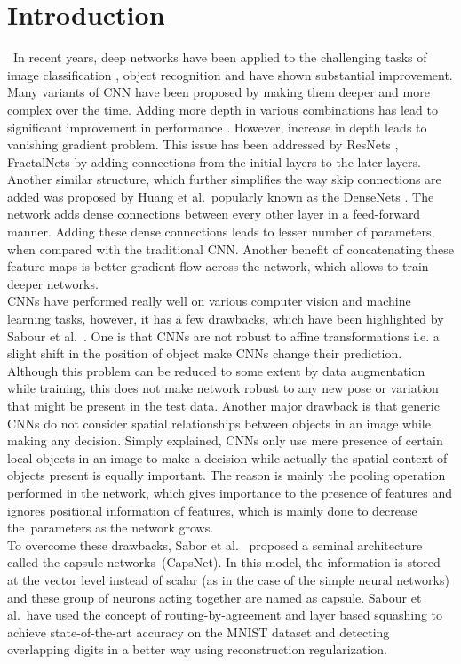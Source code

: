 \documentclass{bmvc2k}
\begin{document}
\section{Introduction}
\label{sec:intro} \
In recent years, deep networks have been applied to the challenging tasks of image classification \cite{Vgg, resnet, imagenet}, object recognition \cite{rec, decaf} and have shown substantial improvement. 
Many variants of CNN have been proposed by making them deeper and more complex over the time. Adding more depth in various combinations has lead to significant improvement in performance \cite{imagenet, Vgg, inception}. However, increase in depth leads to vanishing gradient problem. This issue has been addressed by ResNets \cite{resnet}, FractalNets \cite{fractalnet} by adding connections from the initial layers to the later layers. Another similar structure, which further simplifies the way skip connections are added was proposed by Huang et al.\ popularly known as the DenseNets \cite{densenet}. The network adds dense connections between every other layer in a feed-forward manner. Adding these dense connections leads to lesser number of parameters, when compared with the traditional CNN. Another benefit of concatenating these feature maps is better gradient flow across the network, which allows to train deeper networks.\\
CNNs have performed really well on various computer vision and machine learning tasks, however, it has a few drawbacks, which have been highlighted by Sabour et al.\ \cite{capsnet}. One is that CNNs are not robust to affine transformations i.e. a slight shift in the position of object make CNNs change their prediction. Although this problem can be reduced to some extent by data augmentation while training, this does not make network robust to any new pose or variation that might be present in the test data. Another major drawback is that generic CNNs do not consider spatial relationships between objects in an image while making any decision. Simply explained, CNNs only use mere presence of certain local objects in an image to make a decision while actually the spatial context of objects present is equally important. The reason is mainly the pooling operation performed in the network, which gives importance to the presence of features and ignores positional information of features, which is mainly done to decrease the\ parameters as the network grows. \\ 
To overcome these drawbacks, Sabor et al.\ \cite{capsnet} proposed a seminal architecture called the capsule networks~(CapsNet). In this model, the information is stored at the vector level instead of scalar (as in the case of the simple neural networks) and these group of neurons acting together are named as capsule. Sabour et al.\ have used the concept of routing-by-agreement and layer based squashing to achieve state-of-the-art accuracy on the MNIST dataset and detecting overlapping digits in a better way using reconstruction regularization.\\
\end{document}
